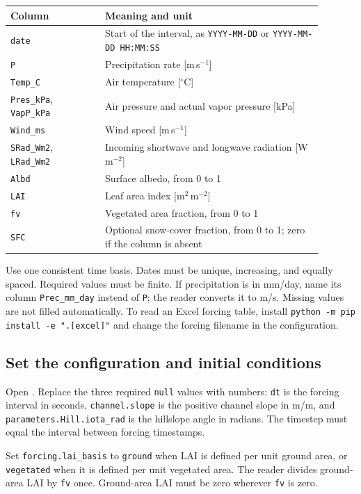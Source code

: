 {\small
\begin{longtable}{p{0.27\linewidth}p{0.62\linewidth}}
\toprule
Column & Meaning and unit \\
\midrule
\endhead
\texttt{date} & Start of the interval, as \texttt{YYYY-MM-DD} or \texttt{YYYY-MM-DD HH:MM:SS} \\
\texttt{P} & Precipitation rate [m\,s$^{-1}$] \\
\texttt{Temp\_C} & Air temperature [$^\circ$C] \\
\texttt{Pres\_kPa}, \texttt{VapP\_kPa} & Air pressure and actual vapor pressure [kPa] \\
\texttt{Wind\_ms} & Wind speed [m\,s$^{-1}$] \\
\texttt{SRad\_Wm2}, \texttt{LRad\_Wm2} & Incoming shortwave and longwave radiation [W\,m$^{-2}$] \\
\texttt{Albd} & Surface albedo, from 0 to 1 \\
\texttt{LAI} & Leaf area index [m$^2$\,m$^{-2}$] \\
\texttt{fv} & Vegetated area fraction, from 0 to 1 \\
\texttt{SFC} & Optional snow-cover fraction, from 0 to 1; zero if the column is absent \\
\bottomrule
\end{longtable}
}

Use one consistent time basis. Dates must be unique, increasing, and equally spaced. Required values must be finite. If precipitation is in mm/day, name its column \texttt{Prec\_mm\_day} instead of \texttt{P}; the reader converts it to m/s. Missing values are not filled automatically. To read an Excel forcing table, install \texttt{python -m pip install -e ".[excel]"} and change the forcing filename in the configuration.

\subsection{Set the configuration and initial conditions}

Open . Replace the three required \texttt{null} values with numbers: \texttt{dt} is the forcing interval in seconds, \texttt{channel.slope} is the positive channel slope in m/m, and \texttt{parameters.Hill.iota\_rad} is the hillslope angle in radians. The timestep must equal the interval between forcing timestamps.

Set \texttt{forcing.lai\_basis} to \texttt{ground} when LAI is defined per unit ground area, or \texttt{vegetated} when it is defined per unit vegetated area. The reader divides ground-area LAI by \texttt{fv} once. Ground-area LAI must be zero wherever \texttt{fv} is zero.

